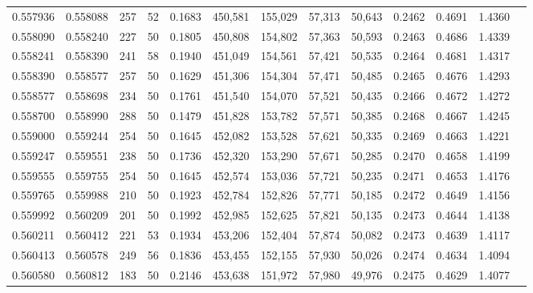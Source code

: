 \begin{tabular}{rrrrrrrrrrrrr}
0.557936 & 0.558088 &   257 &  52 &                                     0.1683 & 450,581 & 155,029 &  57,313 &  50,643 & 0.2462 & 0.4691 & 1.4360 \\
0.558090 & 0.558240 &   227 &  50 &                                     0.1805 & 450,808 & 154,802 &  57,363 &  50,593 & 0.2463 & 0.4686 & 1.4339 \\
0.558241 & 0.558390 &   241 &  58 &                                     0.1940 & 451,049 & 154,561 &  57,421 &  50,535 & 0.2464 & 0.4681 & 1.4317 \\
0.558390 & 0.558577 &   257 &  50 &                                     0.1629 & 451,306 & 154,304 &  57,471 &  50,485 & 0.2465 & 0.4676 & 1.4293 \\
0.558577 & 0.558698 &   234 &  50 &                                     0.1761 & 451,540 & 154,070 &  57,521 &  50,435 & 0.2466 & 0.4672 & 1.4272 \\
0.558700 & 0.558990 &   288 &  50 &                                     0.1479 & 451,828 & 153,782 &  57,571 &  50,385 & 0.2468 & 0.4667 & 1.4245 \\
0.559000 & 0.559244 &   254 &  50 &                                     0.1645 & 452,082 & 153,528 &  57,621 &  50,335 & 0.2469 & 0.4663 & 1.4221 \\
0.559247 & 0.559551 &   238 &  50 &                                     0.1736 & 452,320 & 153,290 &  57,671 &  50,285 & 0.2470 & 0.4658 & 1.4199 \\
0.559555 & 0.559755 &   254 &  50 &                                     0.1645 & 452,574 & 153,036 &  57,721 &  50,235 & 0.2471 & 0.4653 & 1.4176 \\
0.559765 & 0.559988 &   210 &  50 &                                     0.1923 & 452,784 & 152,826 &  57,771 &  50,185 & 0.2472 & 0.4649 & 1.4156 \\
0.559992 & 0.560209 &   201 &  50 &                                     0.1992 & 452,985 & 152,625 &  57,821 &  50,135 & 0.2473 & 0.4644 & 1.4138 \\
0.560211 & 0.560412 &   221 &  53 &                                     0.1934 & 453,206 & 152,404 &  57,874 &  50,082 & 0.2473 & 0.4639 & 1.4117 \\
0.560413 & 0.560578 &   249 &  56 &                                     0.1836 & 453,455 & 152,155 &  57,930 &  50,026 & 0.2474 & 0.4634 & 1.4094 \\
0.560580 & 0.560812 &   183 &  50 &                                     0.2146 & 453,638 & 151,972 &  57,980 &  49,976 & 0.2475 & 0.4629 & 1.4077 \\

\end{tabular}
